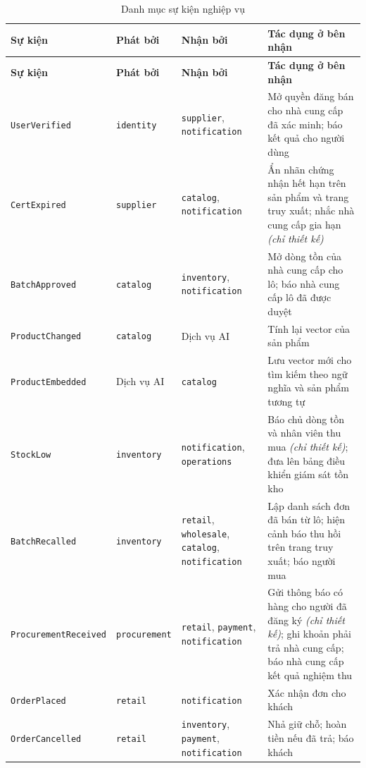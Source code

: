 \begingroup
\tblsetup\tblzebra
\begin{longtable}{L{3.55cm} L{2.20cm} L{3.30cm} L{5.10cm}}
\caption{Danh mục sự kiện nghiệp vụ}
\label{tab:sukien} \\
\toprule
{}
\textbf{Sự kiện} & \textbf{Phát bởi} & \textbf{Nhận bởi} & \textbf{Tác dụng ở bên nhận} \\
\midrule
\endfirsthead
\toprule
{}
\textbf{Sự kiện} & \textbf{Phát bởi} & \textbf{Nhận bởi} & \textbf{Tác dụng ở bên nhận} \\
\midrule
\endhead
\bottomrule
\endfoot
\texttt{UserVerified} & \texttt{identity} & \texttt{supplier}, \texttt{notification} & Mở quyền đăng bán cho nhà cung cấp đã xác minh; báo kết quả cho người dùng \\
\texttt{CertExpired} & \texttt{supplier} & \texttt{catalog}, \texttt{notification} & Ẩn nhãn chứng nhận hết hạn trên sản phẩm và trang truy xuất; nhắc nhà cung cấp gia hạn \emph{(chỉ thiết kế)} \\
\texttt{BatchApproved} & \texttt{catalog} & \texttt{inventory}, \texttt{notification} & Mở dòng tồn của nhà cung cấp cho lô; báo nhà cung cấp lô đã được duyệt \\
\texttt{ProductChanged} & \texttt{catalog} & Dịch vụ AI & Tính lại vector của sản phẩm \\
\texttt{ProductEmbedded} & Dịch vụ AI & \texttt{catalog} & Lưu vector mới cho tìm kiếm theo ngữ nghĩa và sản phẩm tương tự \\
\texttt{StockLow} & \texttt{inventory} & \texttt{notification}, \texttt{operations} & Báo chủ dòng tồn và nhân viên thu mua \emph{(chỉ thiết kế)}; đưa lên bảng điều khiển giám sát tồn kho \\
\texttt{BatchRecalled} & \texttt{inventory} & \texttt{retail}, \texttt{wholesale}, \texttt{catalog}, \texttt{notification} & Lập danh sách đơn đã bán từ lô; hiện cảnh báo thu hồi trên trang truy xuất; báo người mua \\
\texttt{ProcurementReceived} & \texttt{procurement} & \texttt{retail}, \texttt{payment}, \texttt{notification} & Gửi thông báo có hàng cho người đã đăng ký \emph{(chỉ thiết kế)}; ghi khoản phải trả nhà cung cấp; báo nhà cung cấp kết quả nghiệm thu \\
\texttt{OrderPlaced} & \texttt{retail} & \texttt{notification} & Xác nhận đơn cho khách \\
\texttt{OrderCancelled} & \texttt{retail} & \texttt{inventory}, \texttt{payment}, \texttt{notification} & Nhả giữ chỗ; hoàn tiền nếu đã trả; báo khách \\

\end{longtable}
